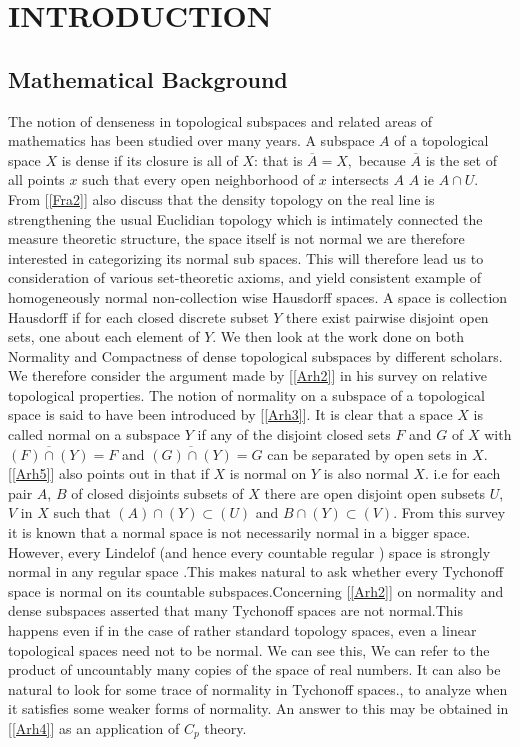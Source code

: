 \documentclass[PhD,14,a4paper]{report}
\theoremstyle{plain}
\theoremstyle{definition}
\theoremstyle{remark}
\numberwithin{figure}{section}
\numberwithin{equation}{subsection}
\begin{document}
{\chapter{INTRODUCTION}
\section{Mathematical Background}
The notion of denseness in topological subspaces and related areas of mathematics has been studied over many years. A subspace $A$ of a topological space $X$ is dense if its closure is all of $X$: that is $\overline{A}=X,$  because  $\overline{A}$ is the set of all points $x$ such that every open neighborhood of $x$ intersects $A$ $A$ ie $A\cap U$. From [\ref{Fra2}] also discuss that the density topology on the real line is strengthening the usual  Euclidian topology which is intimately connected the measure theoretic structure, the space itself is not normal we are therefore interested in categorizing its normal sub spaces. This will therefore lead us to consideration of various set-theoretic axioms, and yield consistent example of homogeneously normal non-collection wise Hausdorff spaces. A space is collection Hausdorff if for each closed discrete subset $Y$ there exist pairwise disjoint open sets, one about each element of $Y$. We then look at the work done on both Normality and Compactness of dense topological subspaces by different scholars. We therefore consider the argument made by [\ref{Arh2}] in his survey on relative topological properties. The notion of normality on a subspace of a topological space is said to have been introduced by [\ref{Arh3}].
It is clear that a space $X$ is called normal on a subspace $Y$ if any of the disjoint closed sets $F$ and $G$ of $X$ with $\overline{( F)\cap(Y)}=F$ and $\overline{(G)\cap(Y)} = G$ can be separated by open sets in $X$. [\ref{Arh5}] also points out in that if $X$ is normal on $Y$ is also normal $X$. i.e for each pair $A$, $B$ of closed disjoints subsets of $X$ there are open disjoint open subsets $U$, $V$ in $X$ such that $( A)\cap(Y)\subset(U)$ and $B\cap(Y)\subset(V)$. From this survey it is known that a normal space is not necessarily normal in a bigger space. However, every Lindelof (and hence every countable regular ) space is strongly normal in any regular space .This makes natural to ask whether every Tychonoff space is normal on its countable subspaces.Concerning [\ref{Arh2}] on normality and dense subspaces asserted that many Tychonoff spaces are not normal.This happens even if in the case of rather standard topology spaces, even a linear topological spaces need not to be normal. We can see this, We can refer to the product of uncountably many copies of the space of real numbers. It can also be natural to look for some trace of normality in Tychonoff spaces., to analyze when it satisfies some weaker forms of normality. An answer to this may be obtained in [\ref{Arh4}] as an application of $C_{p}$ theory.
}
\end{document}
